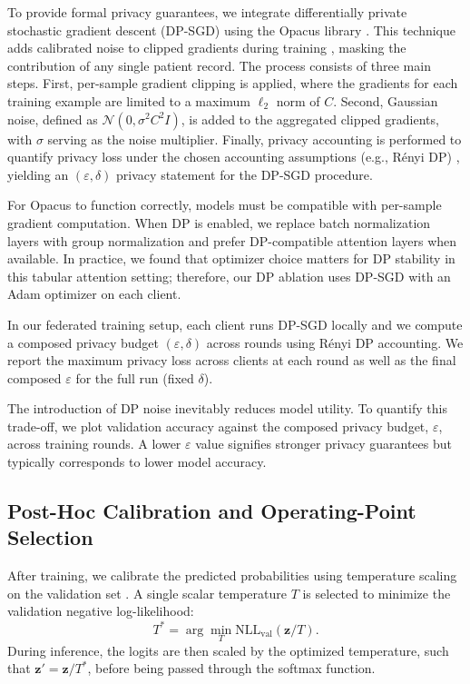 \documentclass[journal,article,submit,pdftex,moreauthors]{Definitions/mdpi}
\begin{document}
To provide formal privacy guarantees, we integrate differentially private stochastic gradient descent (DP-SGD) using the Opacus library \cite{yousefpour2021opacus}. This technique adds calibrated noise to clipped gradients during training \cite{abadi2016deep}, masking the contribution of any single patient record. The process consists of three main steps. First, per-sample gradient clipping is applied, where the gradients for each training example are limited to a maximum $\ell_2$ norm of $C$. Second, Gaussian noise, defined as $\mathcal{N}(0, \sigma^2 C^2 I)$, is added to the aggregated clipped gradients, with $\sigma$ serving as the noise multiplier. Finally, privacy accounting is performed to quantify privacy loss under the chosen accounting assumptions (e.g., R\'enyi DP) \cite{mironov2017}, yielding an $(\varepsilon, \delta)$ privacy statement for the DP-SGD procedure.

For Opacus to function correctly, models must be compatible with per-sample gradient computation. When DP is enabled, we replace batch normalization layers with group normalization and prefer DP-compatible attention layers when available.
In practice, we found that optimizer choice matters for DP stability in this tabular attention setting; therefore, our DP ablation uses DP-SGD with an Adam optimizer on each client.

In our federated training setup, each client runs DP-SGD locally and we compute a composed privacy budget $(\varepsilon,\delta)$ across rounds using R\'enyi DP accounting. We report the maximum privacy loss across clients at each round as well as the final composed $\varepsilon$ for the full run (fixed $\delta$).

The introduction of DP noise inevitably reduces model utility. To quantify this trade-off, we plot validation accuracy against the composed privacy budget, $\varepsilon$, across training rounds. A lower $\varepsilon$ value signifies stronger privacy guarantees but typically corresponds to lower model accuracy.

\subsection{Post-Hoc Calibration and Operating-Point Selection}\label{sec:calibration}

After training, we calibrate the predicted probabilities using temperature scaling on the validation set \cite{guo2017}. A single scalar temperature $T$ is selected to minimize the validation negative log-likelihood:
\begin{equation}
T^* = \arg\min_{T} \text{NLL}_{\text{val}}(\mathbf{z}/T).
\end{equation}
During inference, the logits are then scaled by the optimized temperature, such that $\mathbf{z}' = \mathbf{z}/T^*$, before being passed through the softmax function.
\end{document}
